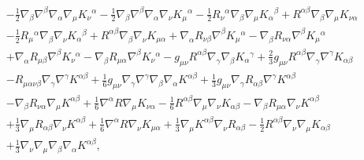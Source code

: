 \begin{eqnarray}
\nonumber\\
&&-  \tfrac{1}{2} \nabla_{\beta}\nabla^{\beta}\nabla_{\alpha}\nabla_{\mu}K_{\nu}{}^{\alpha} 
-  \tfrac{1}{2} \nabla_{\beta}\nabla^{\beta}\nabla_{\alpha}\nabla_{\nu}K_{\mu}{}^{\alpha} -  \tfrac{1}{2} R_{\nu}{}^{\alpha} \nabla_{\beta}\nabla_{\mu}K_{\alpha}{}^{\beta} + R^{\alpha \beta} \nabla_{\beta}\nabla_{\mu}K_{\nu \alpha} 
\nonumber\\
&&-  \tfrac{1}{2} R_{\mu}{}^{\alpha} \nabla_{\beta}\nabla_{\nu}K_{\alpha}{}^{\beta} 
+ R^{\alpha \beta} \nabla_{\beta}\nabla_{\nu}K_{\mu \alpha} 
+ \nabla_{\alpha}R_{\nu \beta} \nabla^{\beta}K_{\mu}{}^{\alpha} 
-  \nabla_{\beta}R_{\nu \alpha} \nabla^{\beta}K_{\mu}{}^{\alpha} 
\nonumber\\
&&+ \nabla_{\alpha}R_{\mu \beta} \nabla^{\beta}K_{\nu}{}^{\alpha} -  \nabla_{\beta}R_{\mu \alpha} \nabla^{\beta}K_{\nu}{}^{\alpha} -  g_{\mu \nu} R^{\alpha \beta} \nabla_{\gamma}\nabla_{\beta}K_{\alpha}{}^{\gamma} 
+ \tfrac{2}{3} g_{\mu \nu} R^{\alpha \beta} \nabla_{\gamma}\nabla^{\gamma}K_{\alpha \beta} 
\nonumber\\
&&
-  R_{\mu \alpha \nu \beta} \nabla_{\gamma}\nabla^{\gamma}K^{\alpha \beta} + \tfrac{1}{6} g_{\mu \nu} \nabla_{\gamma}\nabla^{\gamma}\nabla_{\beta}\nabla_{\alpha}K^{\alpha \beta} + \tfrac{1}{3} g_{\mu \nu} \nabla_{\gamma}R_{\alpha \beta} \nabla^{\gamma}K^{\alpha \beta} 
\nonumber\\
&&-  \nabla_{\beta}R_{\nu \alpha} \nabla_{\mu}K^{\alpha \beta} 
+ \tfrac{1}{6} \nabla^{\alpha}R \nabla_{\mu}K_{\nu \alpha} 
-  \tfrac{1}{6} R^{\alpha \beta} \nabla_{\mu}\nabla_{\nu}K_{\alpha \beta} 
-  \nabla_{\beta}R_{\mu \alpha} \nabla_{\nu}K^{\alpha \beta}  
\nonumber\\
&&+ \tfrac{1}{3} \nabla_{\mu}R_{\alpha \beta} \nabla_{\nu}K^{\alpha \beta} 
+ \tfrac{1}{6} \nabla^{\alpha}R \nabla_{\nu}K_{\mu \alpha} + \tfrac{1}{3} \nabla_{\mu}K^{\alpha \beta} \nabla_{\nu}R_{\alpha \beta} 
-  \tfrac{1}{2} R^{\alpha \beta} \nabla_{\nu}\nabla_{\mu}K_{\alpha \beta}
\nonumber\\
&&+ \tfrac{1}{3} \nabla_{\nu}\nabla_{\mu}\nabla_{\beta}\nabla_{\alpha}K^{\alpha \beta},
\label{AP44}
\end{eqnarray}
%
%
